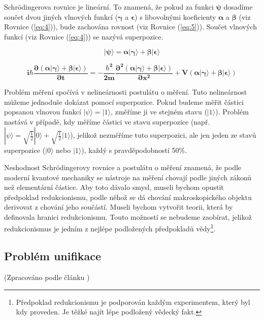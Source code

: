 Schrödingerova rovnice je lineární. To znamená, že pokud za funkci $\bm{\psi}$ dosadíme součet dvou jiných vlnových funkcí ($\bm{\gamma}$ a $\bm{\epsilon}$) s libovolnými koeficienty $\bm{\alpha}$ a $\bm{\beta}$ (viz Rovnice (\ref{eq:4})), bude zachována rovnost (viz Rovnice (\ref{eq:5})). Součet vlnových funkcí (viz Rovnice (\ref{eq:4})) se nazývá superpozice.


\begin{equation}
    \bm{|\psi\rangle = \alpha|\gamma\rangle + \beta|\epsilon\rangle}
    \label{eq:4}
\end{equation}

\begin{equation}
    \bm{i\hbar \frac{\partial \bm{(\alpha|\gamma\rangle + \beta|\epsilon\rangle)}}{\partial t} = -\frac{\hbar^2}{2m}
    \frac{\partial^2 \bm{(\alpha|\gamma\rangle + \beta|\epsilon\rangle)}}{\partial x^2} + V \bm{(\alpha|\gamma\rangle + \beta|\epsilon\rangle)}}
    \label{eq:5}
\end{equation}

Problém měření spočívá v nelineárnosti postulátu o měření. Tuto nelineárnost může\-me jednoduše dokázat pomocí superpozice. Pokud budeme měřit částici popsanou vlnovou funkcí $|\psi\rangle = |1\rangle$, změříme ji ve stejném stavu ($|1\rangle$). Problém nastává v případě, kdy měříme částici ve stavu superpozice (např. $|\psi\rangle = \sqrt{\frac{1}{2}}|0\rangle + \sqrt{\frac{1}{2}}|1\rangle$), jelikož nezměříme tuto superpozici, ale jen jeden ze stavů superpozice ($|0\rangle$ nebo $|1\rangle$), každý s pravděpodobností 50\%.

Neshodnost Schrödingerovy rovnice a postulátu o měření znamená, že podle moderní kvantové mechaniky se nástroje na měření chovají podle jiných zákonů než elementární částice. Aby toto dávalo smysl, museli bychom opustit předpoklad redukcionismu, podle něhož se dá chování makroskopického objektu derivovat z chování jeho součástí. Museli bychom vytvořit teorii, která by definovala hranici redukcionismu. Touto možností se nebudeme zaobírat, jelikož redukcionismus je jedním z nejlépe podložených předpokladů vědy\footnote[2]{Předpoklad redukcionismu je podporován každým experimentem, který byl kdy proveden. Je těžké najít lépe podložený vědecký fakt.}. 

\subsection{Problém unifikace} 
(Zpracováno podle článku \cite{unifprob})

